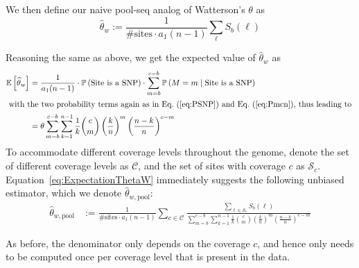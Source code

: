 \documentclass[a4paper,fontsize=9pt,DIV=14]{scrartcl}
\newcounter{todo}
\newcommand\todo[1]{}
\newcommand\eqnref[1]{Eq.~(\ref{#1})}
\newcommand{\samplesize}{n}
\newcommand{\coverage}{c}
\begin{document}
We then define our naive pool-seq analog of Watterson's $\theta$ as
\[
\widehat{\theta}_w :=\frac{1}{\text{\# sites} \cdot a_1(\samplesize-1)}\sum_{\ell} S_b(\ell)
\]
\todo{again, sure that this is $n$ here? same below again. JPS: Yeah -- the $a_1(n-1)$ comes from Coalescent considerations on the $n$ haplotypes in the same (i.e., the sample size).  It's exactly the same $a_1(n-1)$ that shows up in eq. (9)}

Reasoning the same as above, we get the expected value of $\widehat{\theta}_w$ as
%
\begin{align}
    \nonumber
    \mathbb{E}\left[\widehat{\theta}_w\right]
    &= \frac{1}{a_1(\samplesize-1)} \cdot \mathbb{P}\left(\text{Site is a SNP}\right)
        \cdot \sum_{m=b}^{\coverage-b} \mathbb{P}\left(M = m \mid \text{Site is a SNP}\right)
    \\
    \intertext{
        with the two probability terms again as in \eqnref{eq:PSNP} and \eqnref{eq:Pmcn}, thus leading to
    }
    \label{eq:ExpectationThetaW}
    &= \theta\sum_{m=b}^{\coverage-b}\sum_{k=1}^{n-1} \frac{1}{k} \binom{\coverage}{m} \left(\frac{k}{\samplesize}\right)^m \left(\frac{\samplesize-k}{\samplesize}\right)^{\coverage-m}
\end{align}
%
To accommodate different coverage levels throughout the genome, denote the set of different coverage levels as $\mathcal{C}$, and the set of sites with coverage $c$ as $\mathcal{S}_c$. Equation~\ref{eq:ExpectationThetaW} immediately suggests the following unbiased estimator, which we denote $\widehat{\theta}_{w, \text{pool}}$:
%
\begin{align}
    \label{eq:CorrectedThetaEstimate}
    \widehat{\theta}_{w, \text{pool}} &:= \frac{1}{\text{\# sites} \cdot a_1(n-1)}\sum_{c \in \mathcal{C}}
    \frac{
        \sum_{\ell \in \mathcal{S}_c} S_b(\ell)
    }{
         \sum_{m=b}^{\coverage-b}\sum_{k=1}^{n-1} \frac{1}{k} \binom{\coverage}{m} \left(\frac{k}{\samplesize}\right)^m \left(\frac{\samplesize-k}{\samplesize}\right)^{\coverage-m}
    }
\end{align}
%
\todo{I don't think the above is correct. it is using $\widehat{\theta}_w$ in the numerator, which contains the additional $a_1$ term that is not meant to be there, as it cancels out. Jeff, can you check please?  JPS: I fixed to deal with the coverage issue as above.}

As before, the denominator only depends on the coverage $\coverage$,
and hence only needs to be computed once per coverage level that is present in the data.
\end{document}
